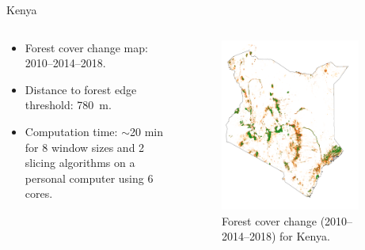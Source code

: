\documentclass[10pt,table,dvipsnames,compress]{beamer}
\begin{document}
\begin{frame}[label={sec:org083ad31}]{Kenya}
\begin{columns}
\begin{column}{0.5\columnwidth}
\begin{itemize}
\item Forest cover change map: 2010--2014--2018.
\item Distance to forest edge threshold: 780 m.
\item Computation time: \(\sim\)20 min for 8 window sizes and 2 slicing algorithms on a personal computer using 6 cores.
\end{itemize}
\end{column}

\begin{column}{0.5\columnwidth}
\begin{figure}[htbp]
\centering
\includegraphics[width=0.9\textwidth]{figs/fcc123_kenya.png}
\caption{Forest cover change (2010--2014--2018) for Kenya.}
\end{figure}
\end{column}
\end{columns}
\end{frame}
\end{document}
